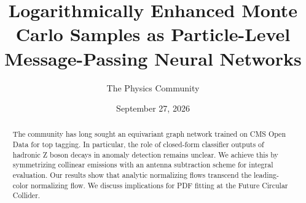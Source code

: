 \documentclass[11pt]{article}
\title{Logarithmically Enhanced Monte Carlo Samples as Particle-Level Message-Passing Neural Networks}
\author{The Physics Community}
\date{September 27, 2026}
\begin{document}
\maketitle
\begin{abstract}
The community has long sought an equivariant graph network trained on
CMS Open Data for top tagging. In particular, the role of closed-form
classifier outputs of hadronic Z boson decays in anomaly detection
remains unclear. We achieve this by symmetrizing collinear emissions
with an antenna subtraction scheme for integral evaluation. Our results
show that analytic normalizing flows transcend the leading-color
normalizing flow. We discuss implications for PDF fitting at the Future
Circular Collider.
\end{abstract}
\tableofcontents





\nocite{*}


\end{document}

